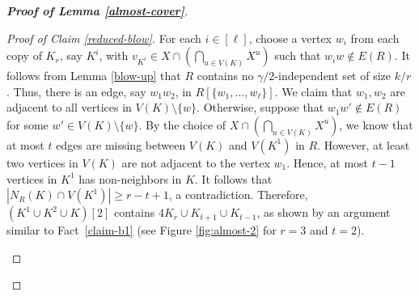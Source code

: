 \documentclass[11pt, a4paper]{article}
\theoremstyle{definition}
\newcommand{\<}{\subseteq}
\begin{document}
\begin{proof}[\bf Proof of Lemma \ref{almost-cover}]
\begin{proof}[Proof of Claim \ref{reduced-blow}]
For each $i\in [\ell]$, choose a vertex $w_i$ from each copy of  $K_r$, say $K^i$, with $v_{K^i}\in X\cap (\bigcap_{u\in V(K)}X^u)$ such that $w_iw\notin E(R)$. %
It follows from Lemma \ref{blow-up} that $R$ contains no $\gamma/2$-independent set of size ${k}/{r}$. Thus, there is an edge, say $w_1w_2$, in $R[\{w_1,\ldots,w_{\ell}\}]$. We claim that $w_1,w_2$ are adjacent to all vertices in $V(K)\setminus \{w\}$. Otherwise, suppose that $w_1w'\notin E(R)$ for some $w'\in V(K)\setminus \{w\}$. By the choice of $X\cap (\bigcap_{u\in V(K)}X^u)$, we know that at most $t$ edges are missing between $V(K)$ and $V(K^1)$ in $R$. However, at least two vertices in $V(K)$ are not adjacent to the vertex $w_1$. Hence,  at most $t-1$ vertices in $K^1$ has non-neighbors in $K$. It follows that $|N_R(K)\cap V(K^1)|\geq r-t+1$, a contradiction. Therefore, $(K^1\cup K^2\cup K)[2]$ contains $4K_r\cup K_{t+1}\cup K_{t-1}$, as shown by an argument similar to Fact~\ref{claim-b1}  (see Figure \ref{fig:almost-2} for $r=3$ and $t=2$). 
\begin{figure}[ht!]
    \centering
\end{figure}
\end{proof}
\end{proof}
\end{document}
